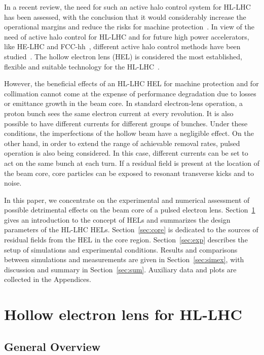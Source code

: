 \documentclass[%
 reprint,
 amsmath,amssymb,
 aps,
prstab,
]{revtex4-1}
\begin{document}
In a recent review, the need for such an active halo control system
for HL-LHC has been assessed, with the conclusion that it would
considerably increase the operational margins and reduce the risks for
machine protection~\cite{helreview}. In view of the need of active
halo control for HL-LHC and for future high power accelerators, like
HE-LHC and FCC-hh~\cite{helhcparam2011, fcc_coll_ipac2017}, different
active halo control methods have been
studied~\cite{helreview_bruce}. The hollow electron lens (HEL) is
considered the most established, flexible and suitable technology for
the HL-LHC~\cite{hel_tevatron_stancari, helreview}.

However, the beneficial effects of an HL-LHC HEL for machine
protection and for collimation cannot come at the expense of
performance degradation due to losses or emittance growth in the beam
core. In standard electron-lens operation, a proton bunch sees the
same electron current at every revolution. It is also possible to have
different currents for different groups of bunches. Under these
conditions, the imperfections of the hollow beam have a negligible
effect. On the other hand, in order to extend the range of achievable
removal rates, pulsed operation is also being considered. In this
case, different currents can be set to act on the same bunch at each
turn. If a residual field is present at the location of the beam core,
core particles can be exposed to resonant transverse kicks and to
noise.

In this paper, we concentrate on the experimental and numerical
assessment of possible detrimental effects on the beam core of a
pulsed electron lens. Section~\ref{sec:hel} gives an introduction to
the concept of HELs and summarizes the design parameters of the HL-LHC
HELs. Section~\ref{sec:core} is dedicated to the sources of residual
fields from the HEL in the core region. Section~\ref{sec:exp}
describes the setup of simulations and experimental
conditions. Results and comparisons between simulations and
measurements are given in Section~\ref{sec:simex}, with discussion and
summary in Section~\ref{sec:sum}. Auxiliary data and plots are
collected in the Appendices.



\section{Hollow electron lens for HL-LHC}
\label{sec:hel}

\subsection{General Overview}
\label{sec:hel:intro}
\end{document}
